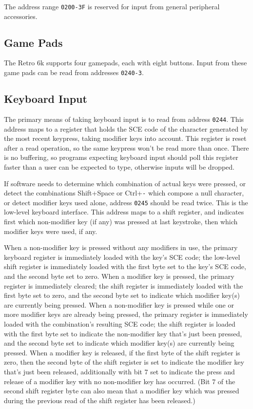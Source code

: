 \documentclass[12pt]{{memoir}}
\begin{document}
The address range \texttt{0200-3F} is reserved for input from general peripheral accessories.

\subsection{Game Pads}

The Retro 6k supports four gamepads, each with eight buttons. Input from these game pads can be read from addresses \texttt{0240-3}.

\subsection{Keyboard Input}
\label{ss:keyboard}

The primary means of taking keyboard input is to read from address \texttt{0244}. This address maps to a register that holds the SCE code of the character generated by the most recent keypress, taking modifier keys into account. This register is reset after a read operation, so the same keypress won't be read more than once. There is no buffering, so programs expecting keyboard input should poll this register faster than a user can be expected to type, otherwise inputs will be dropped.

If software needs to determine which combination of actual keys were pressed, or detect the combinations \textsf{Shift+Space} or \textsf{Ctrl+}\texttt{-} which compose a null character, or detect modifier keys used alone, address \texttt{0245} should be read twice. This is the low-level keyboard interface. This address maps to a shift register, and indicates first which non-modifier key (if any) was pressed at last keystroke, then which modifier keys were used, if any.

When a non-modifier key is pressed without any modifiers in use, the primary keyboard register is immediately loaded with the key's SCE code; the low-level shift register is immediately loaded with the first byte set to the key's SCE code, and the second byte set to zero. When a modifier key is pressed, the primary register is immediately cleared; the shift register is immediately loaded with the first byte set to zero, and the second byte set to indicate which modifier key(s) are currently being pressed. When a non-modifier key is pressed while one or more modifier keys are already being pressed, the primary register is immediately loaded with the combination's resulting SCE code; the shift register is loaded with the first byte set to indicate the non-modifier key that's just been pressed, and the second byte set to indicate which modifier key(s) are currently being pressed. When a modifier key is released, if the first byte of the shift register is zero, then the second byte of the shift register is set to indicate the modifier key that's just been released, additionally with bit 7 set to indicate the press and release of a modifier key with no non-modifier key has occurred. (Bit 7 of the second shift register byte can also mean that a modifier key which was pressed during the previous read of the shift register has been released.)
\end{document}

